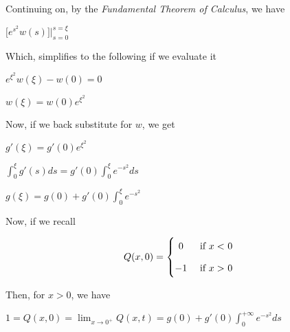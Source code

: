 \documentclass[executivepaper]{article}
\begin{document}
\begin{flushleft}
\begin{center}
\vspace{2mm}

Continuing on, by the \textit{Fundamental Theorem of Calculus}, we have

\vspace{2mm}

$\bigg[e^{s^{2}} w(s)\bigg] \Big |_{s=0}^{s=\xi}$

\vspace{2mm}

Which, simplifies to the following if we evaluate it

\vspace{2mm}

$e^{\xi^{2}}w(\xi)-w(0)=0$

\vspace{2mm}

$w(\xi)=w(0)e^{\xi^2}$

\vspace{2mm}

Now, if we back substitute for $w$, we get

\vspace{2mm}

$g'(\xi)=g'(0)e^{\xi^2}$

\vspace{2mm}

$\int_{0}^{\xi} g'(s) ds=g'(0) \int_{0}^{\xi} e^{-s^{2}} ds$

\vspace{2mm}

$g(\xi)=g(0)+g'(0) \int_{0}^{\xi} e^{-s^{2}}$

\pagebreak

\vspace*{-40mm}

Now, if we recall 

\[
 Q(x,0)=
  \begin{cases} 
      \hfill 0    \hfill & \text{ if $x <$ 0} \\[2ex]
      \hfill -1 \hfill & \text{ if $x >$ 0} \\
  \end{cases}
\]

\vspace{2mm}

Then, for $x > 0$, we have 

\vspace{2mm}

$1=Q(x,0)=\lim_{x \to 0^{+}} Q(x,t)=g(0)+g'(0) \int_{0}^{+\infty} e^{-s^{2}} ds$

\vspace{2mm}


\end{center}
\end{flushleft}
\end{document}
